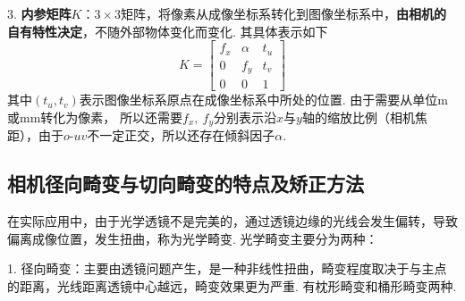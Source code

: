\documentclass[12pt, a4paper, oneside]{ctexart}
\numberwithin{equation}{section}  %
\theoremstyle{definition}
\begin{document}
3. \textbf{内参矩阵$K$}：$3\times 3$矩阵，将像素从成像坐标系转化到图像坐标系中，\textbf{由相机的自有特性决定}，不随外部物体变化而变化. 其具体表示如下
\begin{equation*}
    K = \left[\begin{matrix}
        f_x&\alpha&t_u\\
        0&f_y&t_v\\
        0&0&1
    \end{matrix}\right]
\end{equation*}
其中$(t_u,t_v)$表示图像坐标系原点在成像坐标系中所处的位置. 由于需要从单位m或mm转化为像素，
所以还需要$f_x,\ f_y$分别表示沿$x$与$y$轴的缩放比例（相机焦距），由于$o\text{-}uv$不一定正交，所以还存在倾斜因子$\alpha$.

\subsection{相机径向畸变与切向畸变的特点及矫正方法}
在实际应用中，由于光学透镜不是完美的，通过透镜边缘的光线会发生偏转，导致偏离成像位置，发生扭曲，称为光学畸变. 光学畸变主要分为两种：

1. 径向畸变：主要由透镜问题产生，是一种非线性扭曲，畸变程度取决于与主点的距离，光线距离透镜中心越远，畸变效果更为严重. 有枕形畸变和桶形畸变两种.
\begin{figure}[htbp]
    \centering
\end{figure}
\end{document}
